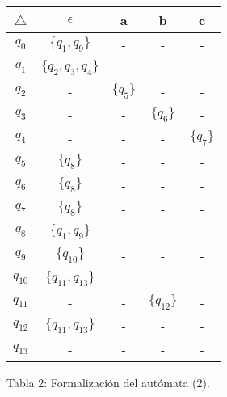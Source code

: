 \begin{center}
\begin{tabular}{c c c c c}
\toprule \toprule
\hspace{20px} $\triangle$ \hspace{20px} & \hspace{20px} $\epsilon$ \hspace{20px} & \hspace{20px} a \hspace{20px} & \hspace{20px} b \hspace{20px} & \hspace{20px} c \hspace{20px}   \\
\midrule \midrule
$q_{0}$ & $\{q_{1}, q_{9}\}$ & - & - & - \\
\cmidrule{1-5}
$q_{1}$ & $\{q_{2}, q_{3}, q_{4}\}$ & - & - & - \\
\cmidrule{1-5}
$q_{2}$ & - & $\{q_{5}\}$ & - & - \\
\cmidrule{1-5}
$q_{3}$ & - & - & $\{q_{6}\}$ & - \\
\cmidrule{1-5}
$q_{4}$ & - & - & - & $\{q_{7}\}$ \\
\cmidrule{1-5}
$q_{5}$ & $\{q_{8}\}$ & - & - & - \\
\cmidrule{1-5}
$q_{6}$ & $\{q_{8}\}$ & - & - & - \\
\cmidrule{1-5}
$q_{7}$ & $\{q_{8}\}$ & - & - & - \\
\cmidrule{1-5}
$q_{8}$ & $\{q_{1}, q_{9}\}$ & - & - & - \\
\cmidrule{1-5}
$q_{9}$ & $\{q_{10}\}$ & - & - & - \\
\cmidrule{1-5}
$q_{10}$ & $\{q_{11}, q_{13}\}$ & - & - & - \\
\cmidrule{1-5}
$q_{11}$ & - & - & $\{q_{12}\}$ & -\\
\cmidrule{1-5}
$q_{12}$ & $\{q_{11}, q_{13}\}$ & - & - & - \\
\cmidrule{1-5}
$q_{13}$ & - & - & - & - \\
\bottomrule
\end{tabular}
\linebreak \linebreak Tabla 2: Formalización del autómata (2).
\end{center}

\pagebreak